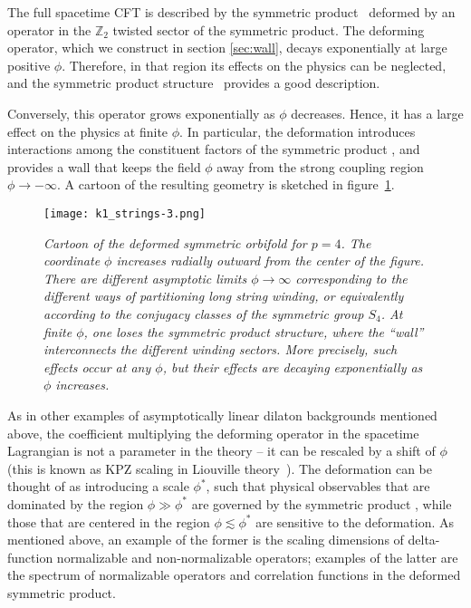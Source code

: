 \documentclass[12pt]{article}
\newcommand{\bZ}{{\mathbb Z}}
\numberwithin{equation}{section}
\begin{document}
The full spacetime CFT is described by the symmetric product \ourcft\ deformed by an operator in the $\bZ_2$ twisted sector of the symmetric product. The deforming operator, which we construct in section \ref{sec:wall}, decays exponentially at large positive $\phi$. Therefore, in that region its effects on the physics can be neglected, and the symmetric product structure \ourcft\ provides a good description. 

Conversely, this operator grows exponentially as $\phi$ decreases. Hence, it has a large effect on the physics at finite $\phi$. In particular, the deformation introduces interactions among the constituent factors of the symmetric product \ourcft, and provides a wall that keeps the field $\phi$ away from the strong coupling region $\phi\to-\infty$.
%
A cartoon of the resulting geometry is sketched in figure~\ref{fig:bagpipes}. 

%
\begin{figure}[ht]
%
\centering
\texttt{[image: k1\_strings-3.png]}
\vspace{-0.5cm}
\caption{\it Cartoon of the deformed symmetric orbifold for $p=4$.  The coordinate $\phi$ increases radially outward from the center of the figure.  There are different asymptotic limits $\phi\to\infty$ corresponding to the different ways of partitioning long string winding, or equivalently according to the conjugacy classes of the symmetric group $S_4$.  At finite $\phi$, one loses the symmetric product structure, where the ``wall'' interconnects the different winding sectors.  More precisely, such effects occur at any $\phi$, but their effects are decaying exponentially as $\phi$ increases.}
\label{fig:bagpipes}
\end{figure}
\vspace{1mm}
%

As in other examples of asymptotically linear dilaton backgrounds mentioned above, the coefficient multiplying the deforming operator in the spacetime Lagrangian is not a parameter in the theory -- it can be rescaled by a shift of $\phi$ (this is known as KPZ scaling in Liouville theory~). The deformation can be thought of as introducing a scale $\phi^*$, such that physical observables that are dominated by the region $\phi\gg\phi^*$ are governed by the symmetric product \ourcft, while those that are centered in the region $\phi\lesssim\phi^*$ are sensitive to the deformation. As mentioned above, an example of the former is the scaling dimensions of delta-function normalizable and non-normalizable operators; examples of the latter are the spectrum of normalizable operators and correlation functions in the deformed symmetric product.  
\end{document}
